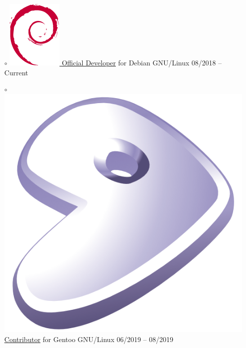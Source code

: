 \documentclass[10pt,margin,line,pifont,palatino,courier]{res}
\begin{document}
\begin{resume}
\begin{itemize}[leftmargin=*]
\begin{itemize}[noitemsep, leftmargin=*]
        \item[$\circ$] \href{https://nm.debian.org/person/lumin/}{
            \includegraphics[height=1.2\fontcharht\font`\B]{openlogo-nd-100.png}
            Official Developer} for Debian GNU/Linux
            \hfill 08/2018 -- Current
        \item[$\circ$] \href{https://wiki.gentoo.org/wiki/Blas-lapack-switch}{
            \includegraphics[height=1.2\fontcharht\font`\B]{gentoo-signet.png}
            Contributor} for Gentoo GNU/Linux
            \hfill 06/2019 -- 08/2019
    \end{itemize}
\end{itemize}


\end{resume}
\end{document}
